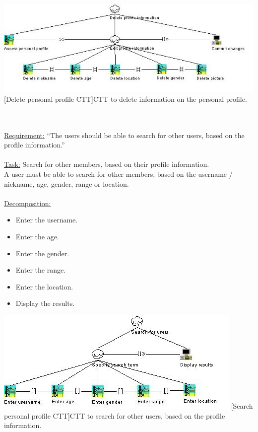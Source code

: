 \documentclass[11pt, a4paper,svglistings,oneside]{book}
\begin{document}
\noindent\begin{minipage}{\textwidth}
    \centering
   \includegraphics[width=\textwidth]{CTT_Profile_Delete.png}
 [Delete personal profile CTT]{CTT to delete information on the personal profile.}
\end{minipage}
$\;$ \\ \\
\underline{Requirement:} ``The users should be able to search for other users, based on the profile information.'' \\ \\
\underline{Task:} Search for other members, based on their profile information. \\
A user must be able to search for other members, based on the username / nickname, age, gender, range or location. \\ \\
\underline{Decomposition:}
\begin{itemize}
\item Enter the username.
\item Enter the age.
\item Enter the gender.
\item Enter the range.
\item Enter the location.
\item Display the results.
\end{itemize}
\noindent\begin{minipage}{\textwidth}
    \centering
   \includegraphics{CTT_Search_Profile.png}
 [Search personal profile CTT]{CTT to search for other users, based on the profile information.}
\end{minipage}
\end{document}
